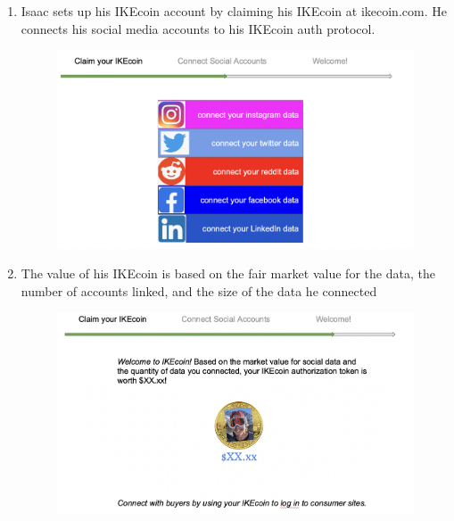 \documentclass[12pt, letterpaper, twoside]{article}
\begin{document}
\begin{enumerate}

\item Isaac sets up his IKEcoin account by claiming his IKEcoin at ikecoin.com. He connects his social media accounts to his IKEcoin auth protocol.
\begin{figure}[h]
\includegraphics[scale=0.3]{media/AddSocial.jpg}
\centering
\end{figure}
  
\item The value of his IKEcoin is based on the fair market value for the data, the number of accounts linked, and the size of the data he connected
\begin{figure}[h]
\includegraphics[scale=0.3]{media/Welcome.jpg}
\centering
\end{figure}
   

\end{enumerate}
\end{document}
